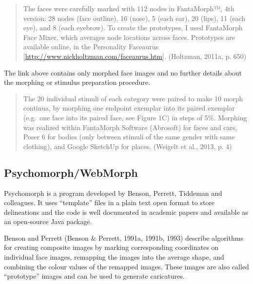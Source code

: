 \documentclass[
  doc,floatsintext]{apa6}
\begin{document}
\begin{quote}
The faces were carefully marked with 112 nodes in FantaMorph™, 4th version: 28 nodes (face outline), 16 (nose), 5 (each ear), 20 (lips), 11 (each eye), and 8 (each eyebrow). To create the prototypes, I used FantaMorph Face Mixer, which averages node locations across faces. Prototypes are available online, in the Personality Faceaurus {[}\url{http://www.nickholtzman.com/faceaurus.htm}{]}. (Holtzman, 2011a, p. 650)
\end{quote}

The link above contains only morphed face images and no further details about the morphing or stimulus preparation procedure.

\begin{quote}
The 20 individual stimuli of each category were paired to make 10 morph continua, by morphing one endpoint exemplar into its paired exemplar (e.g.~one face into its paired face, see Figure 1C) in steps of 5\%. Morphing was realized within FantaMorph Software (Abrosoft) for faces and cars, Poser 6 for bodies (only between stimuli of the same gender with same clothing), and Google SketchUp for places. (Weigelt et al., 2013, p. 4)
\end{quote}

\hypertarget{psychomorph}{%
\subsection{Psychomorph/WebMorph}\label{psychomorph}}

Psychomorph is a program developed by Benson, Perrett, Tiddeman and colleagues. It uses ``template'' files in a plain text open format to store delineations and the code is well documented in academic papers and available as an open-source Java package.

Benson and Perrett (Benson \& Perrett, 1991a, 1991b, 1993) describe algorithms for creating composite images by marking corresponding coordinates on individual face images, remapping the images into the average shape, and combining the colour values of the remapped images. These images are also called ``prototype'' images and can be used to generate caricatures.
\end{document}
